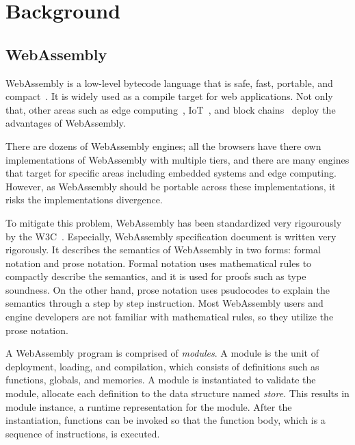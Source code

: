 
\chapter{Background}
\label{ch:background}
\noindent



\section{WebAssembly}
\label{sec:webassembly}


WebAssembly is a low-level bytecode language that is safe, fast, portable, and
compact~\cite{wasm}.
It is widely used as a compile target for web applications.
Not only that, other areas such as edge computing~\cite{wasm-edge},
IoT~\cite{wasm-iot}, and block chains~\cite{wasm-block} deploy the advantages
of WebAssembly.


There are dozens of WebAssembly engines; all the browsers have there own
implementations of WebAssembly with multiple tiers, and there are many engines
that target for specific areas including embedded systems and edge computing.
However, as WebAssembly should be portable across these implementations, it risks
the implementations divergence.


To mitigate this problem, WebAssembly has been standardized very rigourously by
the W3C~\cite{wasm-w3c}.
Especially, WebAssembly specification document is written very rigorously.
It describes the semantics of WebAssembly in two forms: formal notation and
prose notation.
Formal notation uses mathematical rules to compactly describe the semantics,
and it is used for proofs such as type soundness.
On the other hand, prose notation uses psudocodes to explain the semantics
through a step by step instruction.
Most WebAssembly users and engine developers are not familiar with
mathematical rules, so they utilize the prose notation.


A WebAssembly program is comprised of \textit{modules}.
A module is the unit of deployment, loading, and compilation, which consists of
definitions such as functions, globals, and memories.
A module is instantiated to validate the module, allocate each definition to
the data structure named \textit{store}.
This results in module instance, a runtime representation for the module.
After the instantiation, functions can be invoked so that the function body,
which is a sequence of instructions, is executed.

